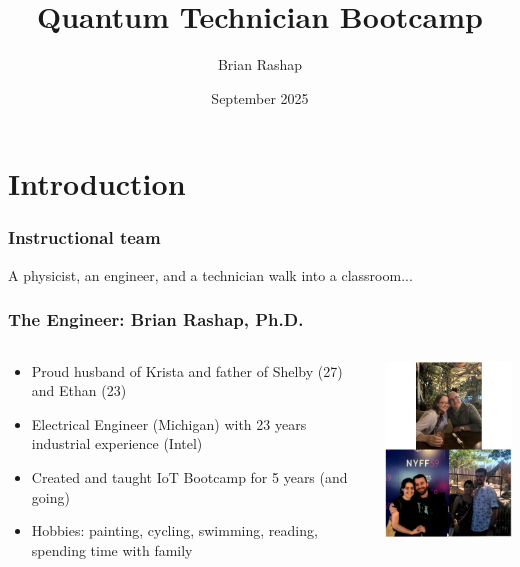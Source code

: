 \documentclass{beamer}
\begin{document}
\title{Quantum Technician Bootcamp}
\author{Brian Rashap}
\date{September 2025} 

\begin{frame}
\titlepage
\end{frame}

\section{Introduction}

\begin{frame}\frametitle{Instructional team}
A physicist, an engineer, and a technician walk into a classroom...
\end{frame}

\begin{frame}
\frametitle{The Engineer: Brian Rashap, Ph.D.}
\begin{columns}
\begin{column}{6.5cm}
\begin{itemize}
\item Proud husband of Krista and father of Shelby (27) and Ethan (23)
\item Electrical Engineer (Michigan) with 23 years industrial experience (Intel)
\item Created and taught IoT Bootcamp for 5 years (and going)
\item Hobbies: painting, cycling, swimming, reading, spending time with family
\end{itemize}
\end{column}
\begin{column}{4.5cm}
\begin{center}
\includegraphics[width=4.5cm]{fig/rashapfamily.jpg}
\end{center}
\end{column}
\end{columns}
\end{frame}
\end{document}
